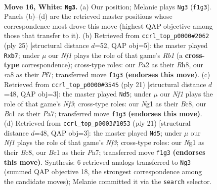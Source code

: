 \documentclass[11pt]{article}
\begin{document}
\clearpage

\begin{figure}[p]\centering
\begin{subfigure}{0.46\textwidth}\centering
\resizebox{\linewidth}{!}{%
\newchessgame
\chessboard[
  setfen={r1b1kb1r/pp3p2/4p3/3pn1Pp/8/8/PP1K2PP/R1B2NNR w kq - 0 16},
  showmover=false,
  pgfstyle=straightmove, color=movearrow, markmove={f1-g3}
]}
\caption{}
\end{subfigure}\hfill
\begin{subfigure}{0.46\textwidth}\centering
\resizebox{\linewidth}{!}{%
\newchessgame
\chessboard[
  setfen={1r1k3r/pB2bppp/4pn2/4p3/8/2N3P1/PPP2P1P/R1B2RK1 b - - 0 13},
  showmover=false,
  pgfstyle=straightmove, color=movearrow, markmove={b8-b7}
]}
\caption{}
\end{subfigure}
\\[4pt]
\begin{subfigure}{0.46\textwidth}\centering
\resizebox{\linewidth}{!}{%
\newchessgame
\chessboard[
  setfen={r1b1kb1r/p4ppp/2p2n2/8/2B5/8/PP3PPP/R1BNK2R b KQkq - 0 11},
  showmover=false,
  pgfstyle=straightmove, color=movearrow, markmove={f6-d5}
]}
\caption{}
\end{subfigure}\hfill
\begin{subfigure}{0.46\textwidth}\centering
\resizebox{\linewidth}{!}{%
\newchessgame
\chessboard[
  setfen={r1b1kb1r/p4ppp/2p2n2/8/2B5/8/PP3PPP/R1BNK2R b KQkq - 0 11},
  showmover=false,
  pgfstyle=straightmove, color=movearrow, markmove={f6-d5}
]}
\caption{}
\end{subfigure}
\caption{\textbf{Move 16, White: \texttt{Ng3}.} (a) Our position; Melanie plays \texttt{Ng3} (\texttt{f1g3}). Panels (b)--(d) are the retrieved master positions whose correspondence most drove this move (highest QAP objective among those that transfer to it). (b) Retrieved from \texttt{ccrl\_top\_p0000\#2062} (ply 25) [structural distance $d$=52, QAP obj=5]: the master played \texttt{Rxb7}; under $\mu$ our \emph{Nf1} plays the role of that game's \emph{Rb1} (a \textbf{cross-type} correspondence); cross-type roles: our \emph{P}a2 as their \emph{R}h8, our \emph{r}a8 as their \emph{P}f7; transferred move \texttt{f1g3} \textbf{(endorses this move)}. (c) Retrieved from \texttt{ccrl\_top\_p0000\#3545} (ply 21) [structural distance $d$=48, QAP obj=3]: the master played \texttt{Nd5}; under $\mu$ our \emph{Nf1} plays the role of that game's \emph{Nf3}; cross-type roles: our \emph{N}g1 as their \emph{B}c8, our \emph{B}c1 as their \emph{P}a7; transferred move \texttt{f1g3} \textbf{(endorses this move)}. (d) Retrieved from \texttt{ccrl\_top\_p0003\#1053} (ply 21) [structural distance $d$=48, QAP obj=3]: the master played \texttt{Nd5}; under $\mu$ our \emph{Nf1} plays the role of that game's \emph{Nf3}; cross-type roles: our \emph{N}g1 as their \emph{B}c8, our \emph{B}c1 as their \emph{P}a7; transferred move \texttt{f1g3} \textbf{(endorses this move)}. Synthesis: 6 retrieved analogs transferred to \texttt{Ng3} (summed QAP objective 18, the strongest correspondence among the candidate moves); Melanie committed it via the \texttt{search} selector.}
\label{fig:thought-m30}
\end{figure}
\end{document}
